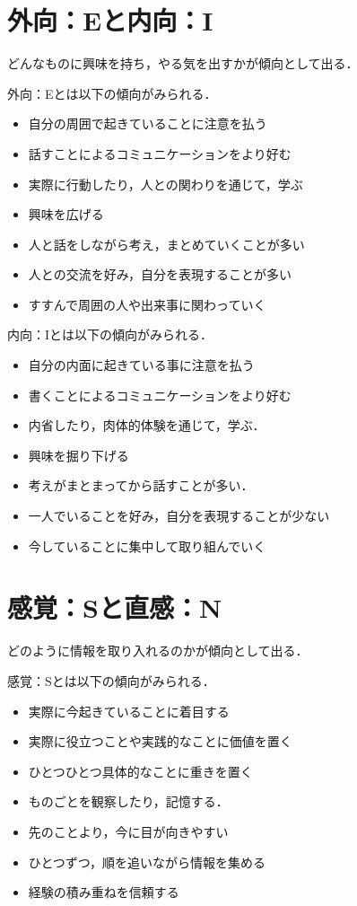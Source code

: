 \newpage
\section{外向：Eと内向：I}
どんなものに興味を持ち，やる気を出すかが傾向として出る．

外向：Eとは以下の傾向がみられる．
\begin{itemize}
\item 自分の周囲で起きていることに注意を払う
\item 話すことによるコミュニケーションをより好む
\item 実際に行動したり，人との関わりを通じて，学ぶ
\item 興味を広げる
\item 人と話をしながら考え，まとめていくことが多い
\item 人との交流を好み，自分を表現することが多い
\item すすんで周囲の人や出来事に関わっていく
\end{itemize}

内向：Iとは以下の傾向がみられる．
\begin{itemize}
\item 自分の内面に起きている事に注意を払う
\item 書くことによるコミュニケーションをより好む
\item 内省したり，肉体的体験を通じて，学ぶ．
\item 興味を掘り下げる
\item 考えがまとまってから話すことが多い．
\item 一人でいることを好み，自分を表現することが少ない
\item 今していることに集中して取り組んでいく
\end{itemize}


\newpage
\section{感覚：Sと直感：N}

どのように情報を取り入れるのかが傾向として出る．

感覚：Sとは以下の傾向がみられる．
\begin{itemize}
\item 実際に今起きていることに着目する
\item 実際に役立つことや実践的なことに価値を置く
\item ひとつひとつ具体的なことに重きを置く
\item ものごとを観察したり，記憶する．
\item 先のことより，今に目が向きやすい
\item ひとつずつ，順を追いながら情報を集める
\item 経験の積み重ねを信頼する
\end{itemize}

